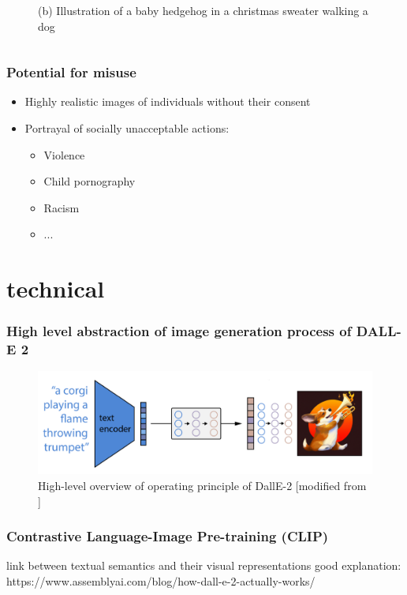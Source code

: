 \documentclass[
	11pt, compress%
]{beamer}
\begin{document}
\begin{frame}
\begin{columns}[c]
\begin{column}{0.5\textwidth}
\begin{figure}
				\caption{(b) Illustration of a baby hedgehog in a christmas sweater walking a dog \cite{DBLP:journals/corr/abs-2102-12092}} 
			\end{figure}
		\end{column}
	\end{columns}
\end{frame}



\begin{frame}
	\frametitle{Potential for misuse}
	\begin{itemize}
			\item{Highly realistic images of individuals without their consent}
			\item{Portrayal of socially unacceptable actions:}
			\begin{itemize}
			\item{Violence}
			\item{Child pornography}
			\item{Racism}
			\item{...}
			\end{itemize}
	\end{itemize}
\end{frame}

\section{technical}

\begin{frame}
	\frametitle{High level abstraction of image generation process of DALL-E 2}
	\begin{figure}
		\includegraphics[width=0.85\linewidth]{Images/highLevel.png}
		\caption{High-level overview of operating principle of DallE-2 [modified from \cite{https://doi.org/10.48550/arxiv.2204.06125}]}
	\end{figure}
\end{frame}

\begin{frame}
	\frametitle{Contrastive Language-Image Pre-training (CLIP)}
	
	link between textual semantics and their visual representations
	good explanation: 
	https://www.assemblyai.com/blog/how-dall-e-2-actually-works/
\end{frame}
\end{document}
